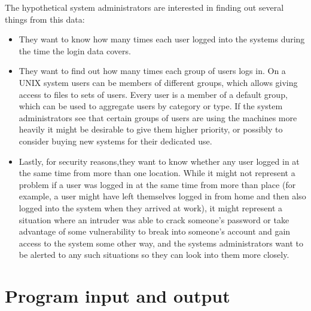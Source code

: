 \documentclass[11pt]{article}
\begin{document}
    The hypothetical system administrators are interested in finding out
  several things from this data:

    \enlargethispage{3mm}

    \vspace{-2.5mm}

    \begin{itemize}

      \addtolength{\itemsep}{-1.5mm}

      \item They want to know how many times each user logged into the
            systems during the time the login data covers.

      \item They want to find out how many times each group of users logs
            in.  On a UNIX system users can be members of different groups,
            which allows giving access to files to sets of users.  Every
            user is a member of a default group, which can be used to
            aggregate users by category or type.  If the system
            administrators see that certain groups of users are using the
            machines more heavily it might be desirable to give them higher
            priority, or possibly to consider buying new systems for their
            dedicated use.

      \item Lastly, for security reasons,they want to know whether any user
            logged in at the same time from more than one location.  While
            it might not represent a problem if a user was logged in at the
            same time from more than place (for example, a user might have
            left themselves logged in from home and then also logged into
            the system when they arrived at work), it might represent a
            situation where an intruder was able to crack someone's password
            or take advantage of some vulnerability to break into someone's
            account and gain access to the system some other way, and the
            systems administrators want to be alerted to any such situations
            so they can look into them more closely.

    \end{itemize}

    \vspace{-3.5mm}

  \section{Program input and output}
\end{document}
